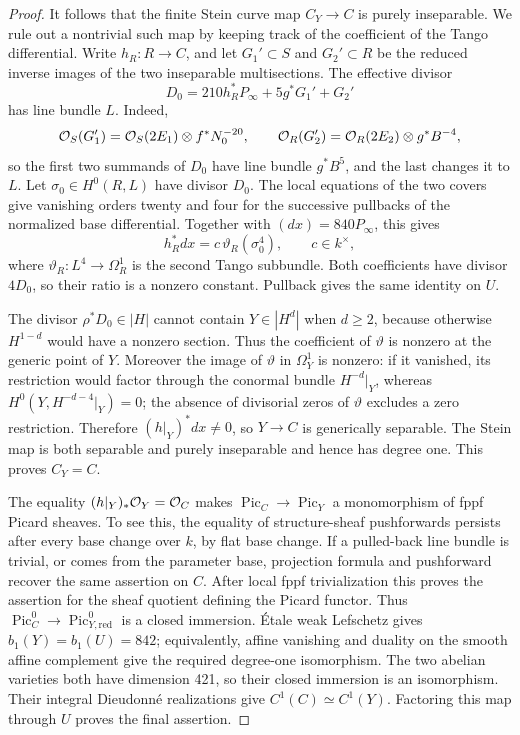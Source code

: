 \begin{proof}
It follows that the finite Stein curve map $C_Y\to C$ is purely inseparable. We rule out a nontrivial such map by keeping track of the coefficient of the Tango differential. Write $h_R:R\to C$, and let $G_1'\subset S$ and $G_2'\subset R$ be the reduced inverse images of the two inseparable multisections. The effective divisor
\[
 D_0=210h_R^*P_\infty+5g^*G_1'+G_2'
\]
has line bundle $L$. Indeed,
\[
 \mathcal O_S(G_1')=\mathcal O_S(2E_1)\otimes f^*N_0^{-20},\qquad
 \mathcal O_R(G_2')=\mathcal O_R(2E_2)\otimes g^*B^{-4},
\]
so the first two summands of $D_0$ have line bundle $g^*B^5$, and the last changes it to $L$. Let $\sigma_0\in H^0(R,L)$ have divisor $D_0$. The local equations of the two covers give vanishing orders twenty and four for the successive pullbacks of the normalized base differential. Together with $(dx)=840P_\infty$, this gives
\[
 h_R^*dx=c\,\vartheta_R(\sigma_0^4),\qquad c\in k^\times,
\]
where $\vartheta_R:L^4\to\Omega_R^1$ is the second Tango subbundle. Both coefficients have divisor $4D_0$, so their ratio is a nonzero constant. Pullback gives the same identity on $U$.

The divisor $\rho^*D_0\in|H|$ cannot contain $Y\in|H^d|$ when $d\ge2$, because otherwise $H^{1-d}$ would have a nonzero section. Thus the coefficient of $\vartheta$ is nonzero at the generic point of $Y$. Moreover the image of $\vartheta$ in $\Omega_Y^1$ is nonzero: if it vanished, its restriction would factor through the conormal bundle $H^{-d}|_Y$, whereas $H^0(Y,H^{-d-4}|_Y)=0$; the absence of divisorial zeros of $\vartheta$ excludes a zero restriction. Therefore $(h|_Y)^*dx\ne0$, so $Y\to C$ is generically separable. The Stein map is both separable and purely inseparable and hence has degree one. This proves $C_Y=C$.

The equality $(h|_Y)_*\mathcal O_Y=\mathcal O_C$ makes $\operatorname{Pic}_C\to\operatorname{Pic}_Y$ a monomorphism of fppf Picard sheaves. To see this, the equality of structure-sheaf pushforwards persists after every base change over $k$, by flat base change. If a pulled-back line bundle is trivial, or comes from the parameter base, projection formula and pushforward recover the same assertion on $C$. After local fppf trivialization this proves the assertion for the sheaf quotient defining the Picard functor. Thus $\operatorname{Pic}^0_C\to\operatorname{Pic}^0_{Y,\mathrm{red}}$ is a closed immersion. Étale weak Lefschetz gives $b_1(Y)=b_1(U)=842$; equivalently, affine vanishing and duality on the smooth affine complement give the required degree-one isomorphism. The two abelian varieties both have dimension 421, so their closed immersion is an isomorphism. Their integral Dieudonné realizations give $C^1(C)\simeq C^1(Y)$. Factoring this map through $U$ proves the final assertion.
\end{proof}

